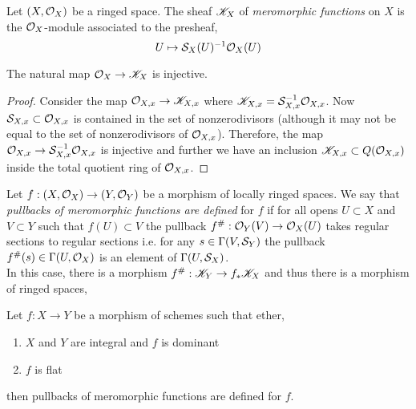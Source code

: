 \documentclass[12pt]{article}
\begin{document}
\begin{definition}
Let $(X, \struct{X})$ be a ringed space. The sheaf $\K_X$ of \textit{meromorphic functions} on $X$ is the $\struct{X}$-module associated to the presheaf,
\[ U \mapsto \S_X(U)^{-1} \struct{X}(U) \]
\end{definition}

\begin{lemma}
The natural map $\struct{X} \to \K_X$ is injective. 
\end{lemma}

\begin{proof}
Consider the map $\stalk{X}{x} \to \K_{X,x}$ where $\K_{X,x} = \S_{X,x}^{-1} \stalk{X}{x}$.  Now $\S_{X,x} \subset \stalk{X}{x}$ is contained in the set of nonzerodivisors (although it may not be equal to the set of nonzerodivisors of $\stalk{X}{x}$). Therefore, the map $\stalk{X}{x} \to \S_{X,x}^{-1} \stalk{X}{x}$ is injective and further we have an inclusion $\K_{X,x} \subset Q(\stalk{X}{x})$ inside the total quotient ring of $\stalk{X}{x}$. 
\end{proof}

\begin{defn}
Let $f : (X, \struct{X}) \to (Y, \struct{Y})$ be a morphism of locally ringed spaces. We say that \textit{pullbacks of meromorphic functions are defined} for $f$ if for all opens $U \subset X$ and $V \subset Y$ such that $f(U) \subset V$ the pullback $f^\# : \struct{Y}(V) \to \struct{X}(U)$ takes regular sections to regular sections i.e. for any $s \in \Gamma(V, \S_Y)$ the pullback $f^\#(s) \in \Gamma(U, \struct{X})$ is an element of $\Gamma(U, \S_X)$.
\bigskip\\
In this case, there is a morphism $f^\# : \K_Y \to f_* \K_X$ and thus there is a morphism of ringed spaces,
\begin{center}
\end{center}
\end{defn}

\begin{prop}
Let $f : X \to Y$ be a morphism of schemes such that ether,
\begin{enumerate}
\item $X$ and $Y$ are integral and $f$ is dominant
\item $f$ is flat
\end{enumerate}
then pullbacks of meromorphic functions are defined for $f$.
\end{prop}
\end{document}
